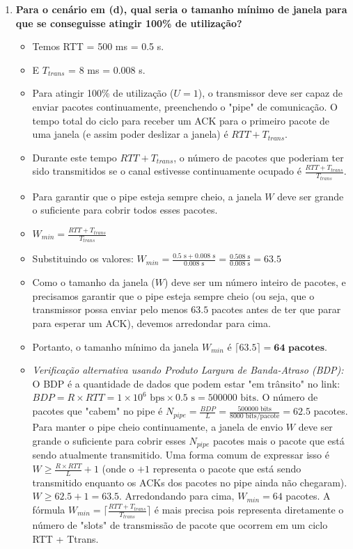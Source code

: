 \begin{enumerate}[label=\alph*.]
    \item \textbf{Para o cenário em (d), qual seria o tamanho mínimo de janela para que se conseguisse atingir 100\% de utilização?}
    \begin{itemize}
        \item Temos RTT = 500 ms = 0.5 s.
        \item E $T_{trans}$ = 8 ms = 0.008 s.
        \item Para atingir 100\% de utilização ($U=1$), o transmissor deve ser capaz de enviar pacotes continuamente, preenchendo o "pipe" de comunicação. O tempo total do ciclo para receber um ACK para o primeiro pacote de uma janela (e assim poder deslizar a janela) é $RTT + T_{trans}$.
        \item Durante este tempo $RTT + T_{trans}$, o número de pacotes que poderiam ter sido transmitidos se o canal estivesse continuamente ocupado é $\frac{RTT + T_{trans}}{T_{trans}}$.
        \item Para garantir que o pipe esteja sempre cheio, a janela $W$ deve ser grande o suficiente para cobrir todos esses pacotes.
        \item $W_{min} = \frac{RTT + T_{trans}}{T_{trans}}$
        \item Substituindo os valores:
        $W_{min} = \frac{0.5 \text{ s} + 0.008 \text{ s}}{0.008 \text{ s}} = \frac{0.508 \text{ s}}{0.008 \text{ s}} = 63.5$
        \item Como o tamanho da janela ($W$) deve ser um número inteiro de pacotes, e precisamos garantir que o pipe esteja sempre cheio (ou seja, que o transmissor possa enviar pelo menos $63.5$ pacotes antes de ter que parar para esperar um ACK), devemos arredondar para cima.
        \item Portanto, o tamanho mínimo da janela $W_{min}$ é $\lceil 63.5 \rceil = \mathbf{64 \text{ pacotes}}$.
        \item \textit{Verificação alternativa usando Produto Largura de Banda-Atraso (BDP):}
        O BDP é a quantidade de dados que podem estar "em trânsito" no link: $BDP = R \times RTT = 1 \times 10^6 \text{ bps} \times 0.5 \text{ s} = 500000 \text{ bits}$.
        O número de pacotes que "cabem" no pipe é $N_{pipe} = \frac{BDP}{L} = \frac{500000 \text{ bits}}{8000 \text{ bits/pacote}} = 62.5$ pacotes.
        Para manter o pipe cheio continuamente, a janela de envio $W$ deve ser grande o suficiente para cobrir esses $N_{pipe}$ pacotes mais o pacote que está sendo atualmente transmitido. Uma forma comum de expressar isso é $W \ge \frac{R \times RTT}{L} + 1$ (onde o $+1$ representa o pacote que está sendo transmitido enquanto os ACKs dos pacotes no pipe ainda não chegaram).
        $W \ge 62.5 + 1 = 63.5$. Arredondando para cima, $W_{min} = 64$ pacotes. A fórmula $W_{min} = \lceil \frac{RTT + T_{trans}}{T_{trans}} \rceil$ é mais precisa pois representa diretamente o número de "slots" de transmissão de pacote que ocorrem em um ciclo RTT + Ttrans.
    \end{itemize}
\end{enumerate}


